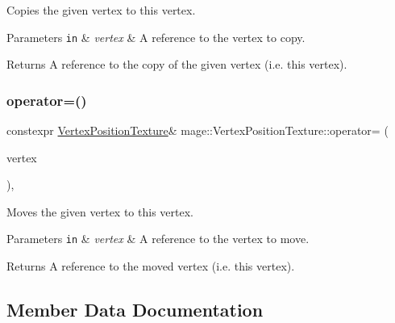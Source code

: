 Copies the given vertex to this vertex.


\begin{DoxyParams}[1]{Parameters}
\mbox{\tt in}  & {\em vertex} & A reference to the vertex to copy. \\
\hline
\end{DoxyParams}
\begin{DoxyReturn}{Returns}
A reference to the copy of the given vertex (i.\+e. this vertex). 
\end{DoxyReturn}
\hypertarget{structmage_1_1_vertex_position_texture_a0f4ffdfe65108d6bac7c2688bcd8f91d}{}\label{structmage_1_1_vertex_position_texture_a0f4ffdfe65108d6bac7c2688bcd8f91d} 
\subsubsection{\texorpdfstring{operator=()}{operator=()}\hspace{0.1cm}{\footnotesize\ttfamily [2/2]}}
{\footnotesize\ttfamily constexpr \hyperlink{structmage_1_1_vertex_position_texture}{Vertex\+Position\+Texture}\& mage\+::\+Vertex\+Position\+Texture\+::operator= (\begin{DoxyParamCaption}\item[{\hyperlink{structmage_1_1_vertex_position_texture}{Vertex\+Position\+Texture} \&\&}]{vertex }\end{DoxyParamCaption})\hspace{0.3cm}{\ttfamily [default]}, {\ttfamily [noexcept]}}

Moves the given vertex to this vertex.


\begin{DoxyParams}[1]{Parameters}
\mbox{\tt in}  & {\em vertex} & A reference to the vertex to move. \\
\hline
\end{DoxyParams}
\begin{DoxyReturn}{Returns}
A reference to the moved vertex (i.\+e. this vertex). 
\end{DoxyReturn}


\subsection{Member Data Documentation}
\hypertarget{structmage_1_1_vertex_position_texture_aa06cfd538a1af9a52ec9114b3d627291}{}\label{structmage_1_1_vertex_position_texture_aa06cfd538a1af9a52ec9114b3d627291} 
